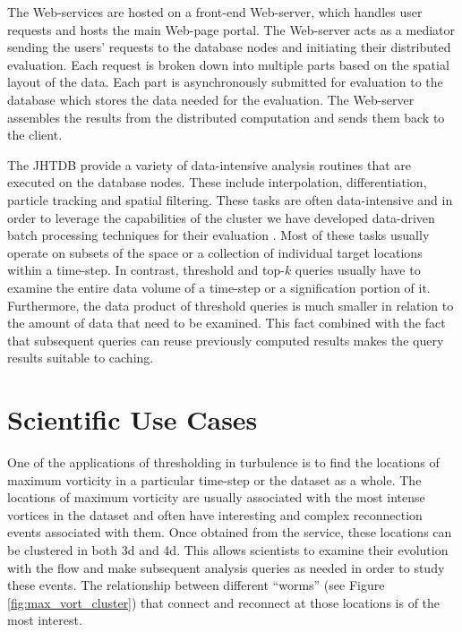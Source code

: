 \documentclass{sig-alternate}
\begin{document}
The Web-services are hosted on a front-end Web-server, which handles user requests and hosts the main Web-page portal.
The Web-server acts as a mediator sending the users' requests to the database nodes and initiating their distributed evaluation. 
Each request is broken down into multiple parts based on the spatial layout of the data. Each part is asynchronously submitted for evaluation 
to the database which stores the data needed for the evaluation.
The Web-server assembles the results from the distributed computation and sends them back to the client.

The JHTDB provide a variety of data-intensive analysis routines that are executed on the database nodes. These include interpolation, 
differentiation, particle tracking and spatial filtering. These tasks are often data-intensive and in order to leverage the capabilities of the cluster we
have developed data-driven batch processing techniques for their evaluation \cite{KanovSC11, KanovSC12}. Most of these tasks usually operate on subsets
of the space or a collection of individual target locations within a time-step. In contrast, threshold and top-$k$ queries usually have to examine the entire 
data volume of a time-step or a signification portion of it. Furthermore, the data product of threshold queries is much smaller in relation to the amount of 
data that need to be examined. This fact combined with the fact that subsequent queries can reuse 
previously computed results makes the query results suitable to caching. 

\section{Scientific Use Cases}\label{science_use_cases}

One of the applications of thresholding in turbulence is to find the locations of maximum vorticity in a particular time-step or the dataset as a whole.
The locations of maximum vorticity are usually associated with the most intense vortices in the dataset and often have interesting and complex
reconnection events associated with them. 
Once obtained from the service, these locations can be clustered in both 3d and 4d. This allows scientists to examine their evolution with the flow
and make subsequent analysis queries as needed in order to study these events. The relationship between different ``worms'' (see Figure \ref{fig:max_vort_cluster}) that connect and reconnect
at those locations is of the most interest.
\end{document}
